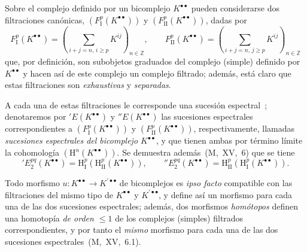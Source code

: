 \begin{env}[11.3.2]
\label{0.11.3.2}
\label{0.11.3.2-fr}
Sobre el complejo definido por un bicomplejo $K^{\bullet\bullet}$ pueden considerarse dos filtraciones canónicas, $(F_{\mathrm I}^p(K^{\bullet\bullet}))$ y $(F_{\mathrm{II}}^p(K^{\bullet\bullet}))$, dadas por
\[
\label{0.11.3.2.1-fr}
  F_{\mathrm I}^p(K^{\bullet\bullet})
  =\left(\sum_{i+j=n,\,i\geq p}K^{ij}\right)_{n\in\mathbb Z},
  \qquad
  F_{\mathrm{II}}^p(K^{\bullet\bullet})
  =\left(\sum_{i+j=n,\,j\geq p}K^{ij}\right)_{n\in\mathbb Z}
  \tag{11.3.2.1}
\]
que, por definición, son subobjetos graduados del complejo (simple) definido por $K^{\bullet\bullet}$ y hacen así de este complejo un complejo filtrado;
además, está claro que estas filtraciones son \emph{exhaustivas} y \emph{separadas}.

A cada una de estas filtraciones le corresponde una sucesión espectral~;
denotaremos por $'E(K^{\bullet\bullet})$ y $''E(K^{\bullet\bullet})$ las sucesiones espectrales correspondientes a $(F_{\mathrm I}^p(K^{\bullet\bullet}))$ y $(F_{\mathrm{II}}^p(K^{\bullet\bullet}))$, respectivamente, llamadas \emph{sucesiones espectrales del bicomplejo $K^{\bullet\bullet}$}, y que tienen ambas por término límite la cohomología $(\mathrm H^n(K^{\bullet\bullet}))$.
Se demuestra además~(M,~XV,~6) que se tiene
\[
\label{0.11.3.2.2-fr}
  'E_2^{pq}(K^{\bullet\bullet})
  =\mathrm H_{\mathrm I}^p(\mathrm H_{\mathrm{II}}^p(K^{\bullet\bullet})),
  \qquad
  ''E_2^{pq}(K^{\bullet\bullet})
  =\mathrm H_{\mathrm{II}}^p(\mathrm H_{\mathrm I}^p(K^{\bullet\bullet})).
  \tag{11.3.2.2}
\]

Todo morfismo $u:K^{\bullet\bullet}\to K^{\prime\bullet\bullet}$ de bicomplejos es \emph{ipso facto} compatible con las filtraciones del mismo tipo de $K^{\bullet\bullet}$ y $K^{\prime\bullet\bullet}$, y define así un morfismo para cada una de las dos sucesiones espectrales;
además, dos morfismos \emph{homótopos} definen una homotopía \emph{de orden $\leq1$} de los complejos (simples) filtrados correspondientes, y por tanto el \emph{mismo} morfismo para cada una de las dos sucesiones espectrales~(M,~XV,~6.1).
\end{env}

